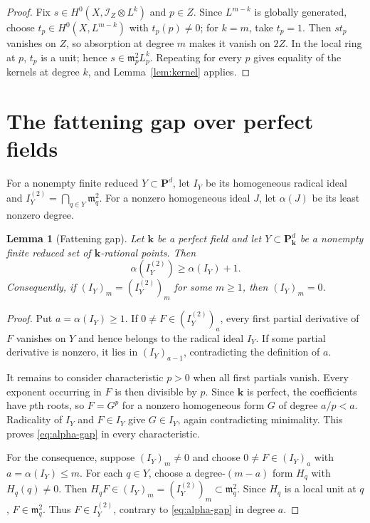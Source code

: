 \documentclass[11pt]{article}
\newtheorem{lemma}[theorem]{Lemma}
\newcommand{\PP}{\mathbf P}
\newcommand{\kk}{\mathbf k}
\newcommand{\cI}{\mathcal I}
\begin{document}
\begin{proof}
Fix $s\in H^0(X,\cI_Z\otimes L^k)$ and $p\in Z$.  Since $L^{m-k}$ is
globally generated, choose $t_p\in H^0(X,L^{m-k})$ with $t_p(p)\neq0$; for
$k=m$, take $t_p=1$.  Then $st_p$ vanishes on $Z$, so absorption at degree
$m$ makes it vanish on $2Z$.  In the local ring at $p$, $t_p$ is a unit;
hence $s\in\mathfrak m_p^2L^k_p$.  Repeating for every $p$ gives equality of
the kernels at degree $k$, and Lemma~\ref{lem:kernel} applies.
\end{proof}

\section{The fattening gap over perfect fields}\label{sec:fattening}

For a nonempty finite reduced $Y\subset\PP^d$, let $I_Y$ be its homogeneous
radical ideal and $I_Y^{(2)}=\bigcap_{q\in Y}\mathfrak m_q^2$.  For a
nonzero homogeneous ideal $J$, let $\alpha(J)$ be its least nonzero degree.

\begin{lemma}[Fattening gap]\label{lem:fattening-gap}
Let $\kk$ be a perfect field and let $Y\subset\PP^d_{\kk}$ be a nonempty
finite reduced set of $\kk$-rational points.  Then
\begin{equation}\label{eq:alpha-gap}
 \alpha(I_Y^{(2)})\geq\alpha(I_Y)+1.
\end{equation}
Consequently, if $(I_Y)_m=(I_Y^{(2)})_m$ for some $m\geq1$, then
$(I_Y)_m=0$.
\end{lemma}

\begin{proof}
Put $a=\alpha(I_Y)\geq1$.  If $0\neq F\in(I_Y^{(2)})_a$, every first partial
derivative of $F$ vanishes on $Y$ and hence belongs to the radical ideal
$I_Y$.  If some partial derivative is nonzero, it lies in $(I_Y)_{a-1}$,
contradicting the definition of $a$.

It remains to consider characteristic $p>0$ when all first partials vanish.
Every exponent occurring in $F$ is then divisible by $p$.  Since $\kk$ is
perfect, the coefficients have $p$th roots, so $F=G^p$ for a nonzero
homogeneous form $G$ of degree $a/p<a$.  Radicality of $I_Y$ and
$F\in I_Y$ give $G\in I_Y$, again contradicting minimality.  This proves
\eqref{eq:alpha-gap} in every characteristic.

For the consequence, suppose $(I_Y)_m\neq0$ and choose
$0\neq F\in(I_Y)_a$ with $a=\alpha(I_Y)\leq m$.  For each $q\in Y$, choose
a degree-$(m-a)$ form $H_q$ with $H_q(q)\neq0$.  Then
$H_qF\in(I_Y)_m=(I_Y^{(2)})_m\subset\mathfrak m_q^2$.  Since $H_q$ is a
local unit at $q$, $F\in\mathfrak m_q^2$.  Thus $F\in I_Y^{(2)}$, contrary
to \eqref{eq:alpha-gap} in degree $a$.
\end{proof}
\end{document}

